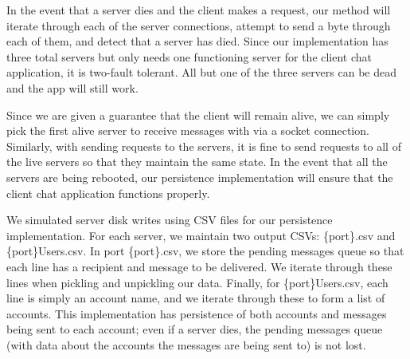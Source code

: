 \documentclass[
	a4paper, %
	10pt, %
	unnumberedsections, %
	twoside, %
]{LTJournalArticle}
\begin{document}
In the event that a server dies and the client makes a request, our method will iterate through each of the server connections, attempt to send a byte through each of them, and detect that a server has died. Since our implementation has three total servers but only needs one functioning server for the client chat application, it is two-fault tolerant. All but one of the three servers can be dead and the app will still work.

Since we are given a guarantee that the client will remain alive, we can simply pick the first alive server to receive messages with via a socket connection. Similarly, with sending requests to the servers, it is fine to send requests to all of the live servers so that they maintain the same state. In the event that all the servers are being rebooted, our persistence implementation will ensure that the client chat application functions properly. 

We simulated server disk writes using CSV files for our persistence implementation. For each server, we maintain two output CSVs: \{port\}.csv and \{port\}Users.csv. In port \{port\}.csv, we store the pending messages queue so that each line has a recipient and message to be delivered. 
We iterate through these lines when pickling and unpickling our data. Finally, for \{port\}Users.csv, each line is simply an account name, and we iterate through these to form a list of accounts. This implementation has persistence of both accounts and messages being sent to each account; even if a server dies, the pending messages queue (with data about the accounts the messages are being sent to) is not lost.
\end{document}
